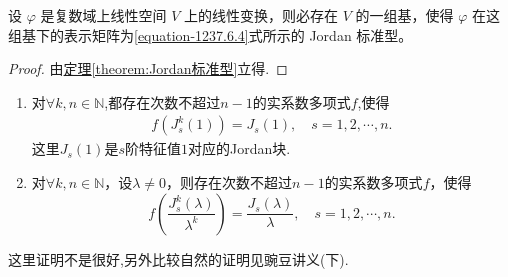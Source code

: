 \documentclass[../../main.tex]{subfiles}
\begin{document}
\begin{theorem}\label{theorem:线性变换一定有一个Jordan矩阵作为其表示矩阵}
设 $\varphi$ 是复数域上线性空间 $V$ 上的线性变换，则必存在 $V$ 的一组基，使得 $\varphi$ 在这组基下的表示矩阵为\eqref{equation-1237.6.4}式所示的 Jordan 标准型。
\end{theorem}
\begin{proof}
由\hyperref[theorem:Jordan标准型]{定理\ref{theorem:Jordan标准型}}立得.

\end{proof}

\begin{proposition}\label{proposition:特征值为1的Jordan块可由其k次幂的多项式表示}
\begin{enumerate}[(1)]
\item 对$\forall k,n\in \mathbb{N}$,都存在次数不超过$n-1$的实系数多项式$f$,使得
\begin{align}\label{eq::28947234n9jf0wej0}
f\left( J_{s}^{k}(1) \right) =J_s(1),\quad s=1,2,\cdots ,n.
\end{align}
这里$J_s(1)$是$s$阶特征值$1$对应的Jordan块.

\item 对$\forall k,n\in \mathbb{N}$，设$\lambda \ne 0$，则存在次数不超过$n-1$的实系数多项式$f$，使得
\[
f\left( \frac{J_{s}^{k}\left( \lambda \right)}{\lambda ^k} \right) =\frac{J_s\left( \lambda \right)}{\lambda},\quad s=1,2,\cdots ,n.
\]
\end{enumerate}
\end{proposition}
\begin{note}
这里证明不是很好,另外比较自然的证明见豌豆讲义(下).
\end{note}
\end{document}
